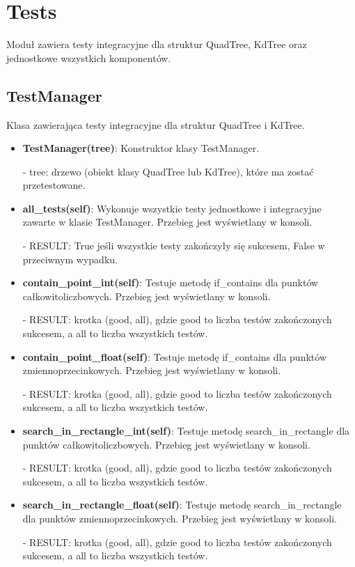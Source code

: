 \documentclass{lab}
\begin{document}
\section{Tests}
Moduł zawiera testy integracyjne dla struktur QuadTree, KdTree oraz jednostkowe wszystkich komponentów.
\subsection{TestManager}
Klasa zawierająca testy integracyjne dla struktur QuadTree i KdTree.
\begin{itemize}
  \item \textbf{TestManager(tree)}:
  Konstruktor klasy TestManager.

  - tree: drzewo (obiekt klasy QuadTree lub KdTree), które ma zostać przetestowane.

  \item \textbf{all\_tests(self)}:
  Wykonuje wszystkie testy jednostkowe i integracyjne zawarte w klasie TestManager. Przebieg jest wyświetlany w konsoli.

  - RESULT: True jeśli wszystkie testy zakończyły się sukcesem, False w przeciwnym wypadku.

  \item \textbf{contain\_point\_int(self)}:
  Testuje metodę if\_contains dla punktów całkowitoliczbowych. Przebieg jest wyświetlany w konsoli.

  - RESULT: krotka (good, all), gdzie good to liczba testów zakończonych sukcesem, a all to liczba wszystkich testów.

  \item \textbf{contain\_point\_float(self)}:
  Testuje metodę if\_contains dla punktów zmiennoprzecinkowych. Przebieg jest wyświetlany w konsoli.

  - RESULT: krotka (good, all), gdzie good to liczba testów zakończonych sukcesem, a all to liczba wszystkich testów.

  \item \textbf{search\_in\_rectangle\_int(self)}:
  Testuje metodę search\_in\_rectangle dla punktów całkowitoliczbowych. Przebieg jest wyświetlany w konsoli.

  - RESULT: krotka (good, all), gdzie good to liczba testów zakończonych sukcesem, a all to liczba wszystkich testów.

  \item \textbf{search\_in\_rectangle\_float(self)}:
  Testuje metodę search\_in\_rectangle dla punktów zmiennoprzecinkowych. Przebieg jest wyświetlany w konsoli.

  - RESULT: krotka (good, all), gdzie good to liczba testów zakończonych sukcesem, a all to liczba wszystkich testów.
\end{itemize}
\end{document}

